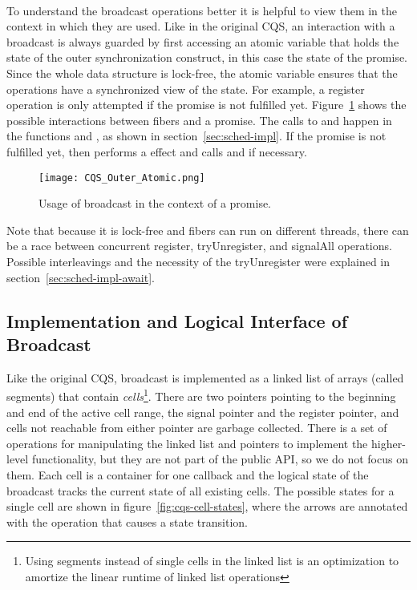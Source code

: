 \paragraph*{}
To understand the broadcast operations better it is helpful to view them in the context in which they are used.
Like in the original CQS, an interaction with a broadcast is always guarded by first accessing an atomic variable that holds the state of the outer synchronization construct, in this case the state of the promise.
Since the whole data structure is lock-free, the atomic variable ensures that the operations have a synchronized view of the state.
For example, a register operation is only attempted if the promise is not fulfilled yet.
Figure~\ref{fig:cqs-usage} shows the possible interactions between fibers and a promise.
The calls to  and  happen in the functions  and , as shown in section~\ref{sec:sched-impl}.
If the promise is not fulfilled yet,  then performs a \esuspend{} effect and calls  and  if necessary.

\begin{figure}[ht]
  \texttt{[image: CQS\_Outer\_Atomic.png]}
  \caption{Usage of broadcast in the context of a promise.}
  \label{fig:cqs-usage}
\end{figure}

Note that because it is lock-free and fibers can run on different threads, there can be a race between concurrent register, tryUnregister, and signalAll operations.
Possible interleavings and the necessity of the tryUnregister were explained in section~\ref{sec:sched-impl-await}.

\subsection{Implementation and Logical Interface of Broadcast}
\label{sec:broadcast-impl}


Like the original CQS, broadcast is implemented as a linked list of arrays (called segments) that contain \emph{cells}\footnote{Using segments instead of single cells in the linked list is an optimization to amortize the linear runtime of linked list operations}.
There are two pointers pointing to the beginning and end of the active cell range, the signal pointer and the register pointer, and cells not reachable from either pointer are garbage collected.
There is a set of operations for manipulating the linked list and pointers to implement the higher-level functionality, but they are not part of the public API, so we do not focus on them.
Each cell is a container for one callback and the logical state of the broadcast tracks the current state of all existing cells.
The possible states for a single cell are shown in figure~\ref{fig:cqs-cell-states}, where the arrows are annotated with the operation that causes a state transition.

